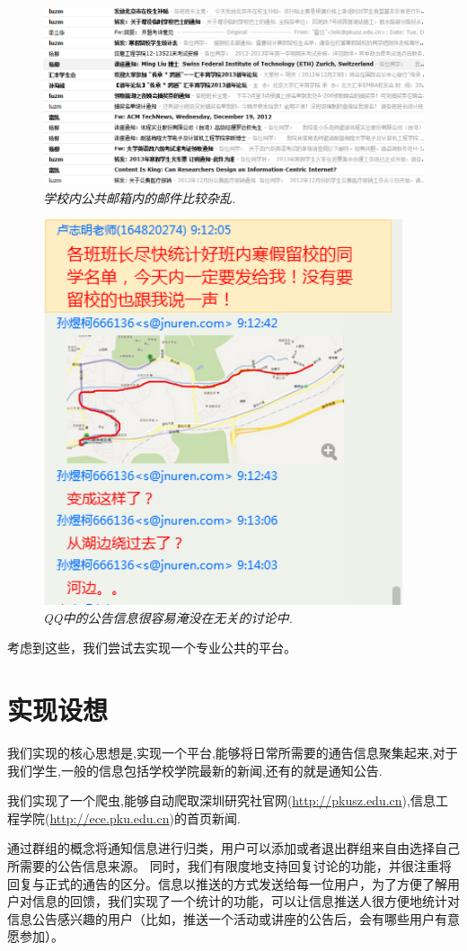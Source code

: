 \documentclass[a4paper]{ctexart}
\begin{document}
    \begin{figure}
        \centering
        \includegraphics[width=500pt]{File8.png}
        \caption{\small \sl 学校内公共邮箱内的邮件比较杂乱.}
        \label{fig:school-mail}
    \end{figure}
    \begin{figure}
        \centering
        \includegraphics[width=300pt]{File2.png}
        \caption{\small \sl QQ中的公告信息很容易淹没在无关的讨论中.}
        \label{fig:qq-message}
    \end{figure}
    \par 考虑到这些，我们尝试去实现一个专业公共的平台。

\section{实现设想}
    \par 我们实现的核心思想是,实现一个平台,能够将日常所需要的通告信息聚集起来,对于我们学生,一般的信息包括学校学院最新的新闻,还有的就是通知公告.
    \par 我们实现了一个爬虫,能够自动爬取深圳研究社官网(\url{http://pkusz.edu.cn}),信息工程学院(\url{http://ece.pku.edu.cn})的首页新闻.
    \par 通过群组的概念将通知信息进行归类，用户可以添加或者退出群组来自由选择自己所需要的公告信息来源。 同时，我们有限度地支持回复讨论的功能，并很注重将回复与正式的通告的区分。信息以推送的方式发送给每一位用户，为了方便了解用户对信息的回馈，我们实现了一个统计的功能，可以让信息推送人很方便地统计对信息公告感兴趣的用户（比如，推送一个活动或讲座的公告后，会有哪些用户有意愿参加）。
\end{document}
